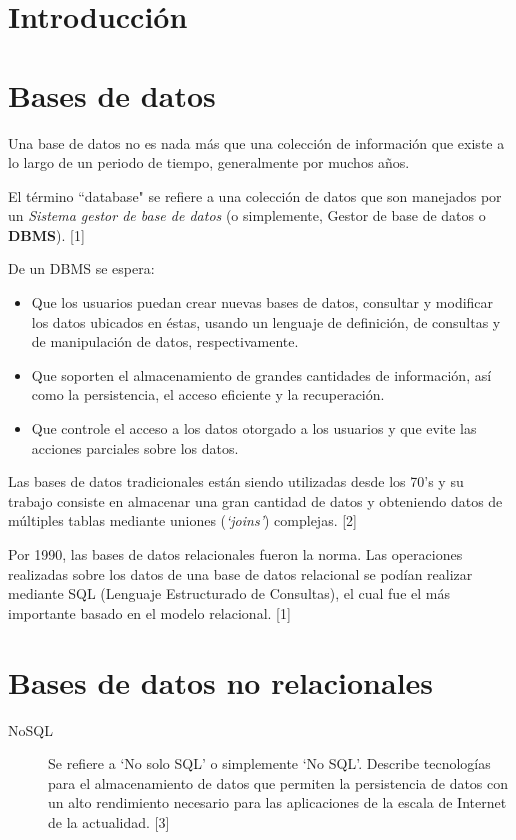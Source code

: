 \documentclass[twocolumn]{article}
\begin{document}
\section{Introducción}


\section{Bases de datos}

Una base de datos no es nada más que una colección de información que existe a lo largo de un periodo de tiempo, generalmente por muchos años.

El término ``database" se refiere a una colección de datos que son manejados por un \textit{Sistema gestor de base de datos} (o simplemente, Gestor de base de datos o \textbf{DBMS}). [1]

De un DBMS se espera:

\begin{itemize}
  \item Que los usuarios puedan crear nuevas bases de datos, consultar y modificar los datos ubicados en éstas, usando un lenguaje de definición, de consultas y de manipulación de datos, respectivamente.
  \item Que soporten el almacenamiento de grandes cantidades de información, así como la persistencia, el acceso eficiente y la recuperación.
  \item Que controle el acceso a los datos otorgado a los usuarios y que evite las acciones parciales sobre los datos.
\end{itemize}

Las bases de datos tradicionales están siendo utilizadas desde los 70's y su trabajo consiste en almacenar una gran cantidad de datos y obteniendo datos de múltiples tablas mediante uniones (\textit{`joins'}) complejas. [2]

Por 1990, las bases de datos relacionales fueron la norma. Las operaciones realizadas sobre los datos de una base de datos relacional se podían realizar mediante SQL (Lenguaje Estructurado de Consultas), el cual fue el más importante basado en el modelo relacional. [1]

\section{Bases de datos no relacionales}

\begin{description}
  \item[NoSQL] Se refiere a `No solo SQL' o simplemente `No SQL'. Describe tecnologías para el almacenamiento de datos que permiten la persistencia de datos con un alto rendimiento necesario para las aplicaciones de la escala de Internet de la actualidad. [3]
\end{description}
\end{document}
